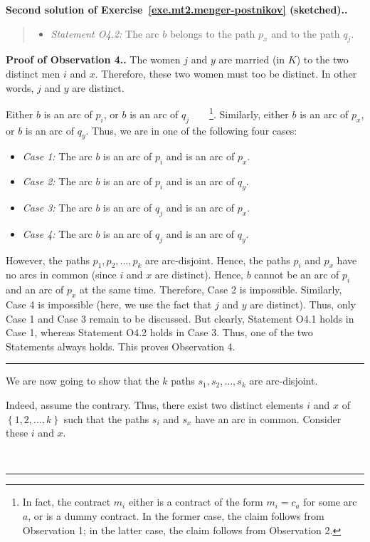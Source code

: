 \documentclass[numbers=enddot,12pt,final,onecolumn,notitlepage]{scrartcl}%
\theoremstyle{definition}
\newenvironment{statement}{\begin{quote}}{\end{quote}}
\newenvironment{proof}[1][Proof]{\noindent\textbf{#1.} }{\ \rule{0.5em}{0.5em}}
\newcommand{\set}[1]{\left\{ #1 \right\}}
\begin{document}
\begin{proof}[Second solution of
Exercise~\ref{exe.mt2.menger-postnikov} (sketched).]
\begin{statement}
\begin{itemize}
\item \textit{Statement O4.2:}
   The arc $b$ belongs to the path $p_x$ and to the
   path $q_j$.
\end{itemize}

\end{statement}

\begin{proof}[Proof of Observation 4.]
The women $j$ and $y$ are married (in $K$) to the two distinct
men $i$ and $x$.
Therefore, these two women must too be distinct.
In other words, $j$ and $y$ are distinct.

Either $b$ is an arc of $p_i$, or $b$ is an arc of
$q_j$\ \ \ \ \footnote{In fact, the contract $m_i$ either
  is a contract of the form $m_i = c_a$ for some arc $a$,
  or is a dummy contract.
  In the former case, the claim follows from Observation 1;
  in the latter case, the claim follows from Observation 2.}.
Similarly, either $b$ is an arc of $p_x$, or $b$ is an arc
of $q_y$.
Thus, we are in one of the following four cases:

\begin{itemize}
 \item \textit{Case 1:} The arc $b$ is an arc of $p_i$ and is an
       arc of $p_x$.
 \item \textit{Case 2:} The arc $b$ is an arc of $p_i$ and is an
       arc of $q_y$.
 \item \textit{Case 3:} The arc $b$ is an arc of $q_j$ and is an
       arc of $p_x$.
 \item \textit{Case 4:} The arc $b$ is an arc of $q_j$ and is an
       arc of $q_y$.
\end{itemize}

However, the paths $p_1, p_2, \ldots, p_k$ are arc-disjoint.
Hence, the paths $p_i$ and $p_x$ have no arcs in common (since
$i$ and $x$ are distinct).
Hence, $b$ cannot be an arc of $p_i$ and an arc of $p_x$ at the
same time.
Therefore, Case 2 is impossible.
Similarly, Case 4 is impossible (here, we use the fact that $j$
and $y$ are distinct).
Thus, only Case 1 and Case 3 remain to be discussed.
But clearly, Statement O4.1 holds in Case 1, whereas
Statement O4.2 holds in Case 3.
Thus, one of the two Statements always holds.
This proves Observation 4.
\end{proof}

We are now going to show that the $k$ paths
$s_1, s_2, \ldots, s_k$ are arc-disjoint.

Indeed, assume the contrary.
Thus, there exist two distinct elements $i$ and $x$ of
$\set{1, 2, \ldots, k}$ such that the paths $s_i$ and $s_x$ have
an arc in common.
Consider these $i$ and $x$.


\end{proof}
\end{document}
